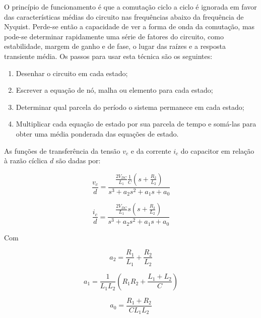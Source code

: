     O princípio de funcionamento é que a comutação ciclo a ciclo é ignorada em
    favor das características médias do circuito nas frequências abaixo da
    frequência de Nyquist. Perde-se então a capacidade de ver a forma de onda
    da comutação, mas pode-se determinar rapidamente uma série de fatores
    do circuito, como estabilidade, margem de ganho e de fase, o lugar das
    raízes e a resposta transiente média. Os passos para usar esta técnica são
    os seguintes:

    \begin{enumerate}
        \item Desenhar o circuito em cada estado;
        \item Escrever a equação de nó, malha ou elemento para cada estado;
        \item Determinar qual parcela do período o sistema permanece em cada estado;
        \item Multiplicar cada equação de estado por sua parcela de tempo e somá-las
            para obter uma média ponderada das equações de estado.
    \end{enumerate}

    As funções de transferência da tensão $v_c$ e da corrente $i_c$ do
    capacitor em relação à razão cíclica $d$ são dadas por:

    \begin{equation}
        \frac{v_c}{d} = \frac{\frac{2V_{DC}}{L_1} \frac{1}{C}
        	\left( s + \frac{R_2}{L_2} \right)}{s^3 + a_2 s^2 + a_1 s + a_0}
        \label{eq:vc}
    \end{equation}

    \begin{equation}
        \frac{i_c}{d} = \frac{\frac{2V_{DC}}{L_1} s
        	\left( s + \frac{R_2}{L_2} \right)}{s^3 + a_2 s^2 + a_1 s + a_0}
        \label{eq:ic}
    \end{equation}

    Com

    \begin{equation*}
        a_2 = \frac{R_1}{L_1} + \frac{R_2}{L_2}
    \end{equation*}

    \begin{equation*}
        a_1 = \frac{1}{L_1 L_2} \left( R_1 R_2 + \frac{L_1 + L_2}{C} \right)
    \end{equation*}

    \begin{equation*}
        a_0 = \frac{R_1 + R_2}{C L_1 L_2}
    \end{equation*}


